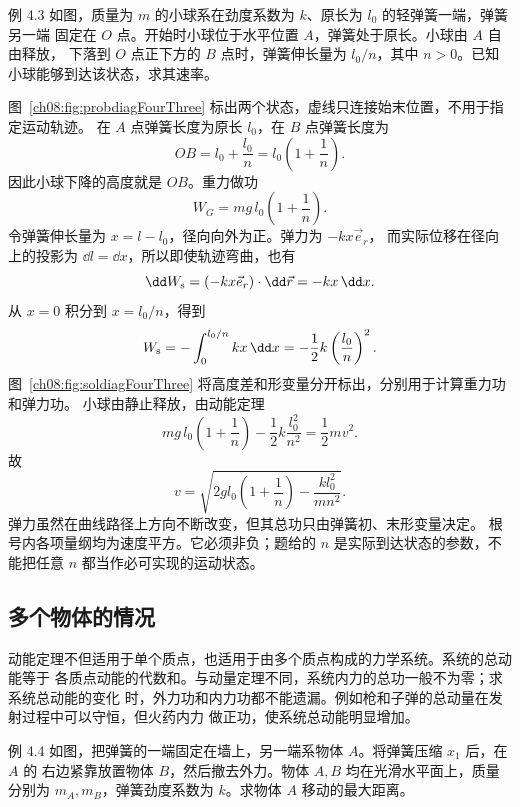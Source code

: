 \Needspace{0.35\textheight}
\begin{origexamplebox}{例 4.3}
如图，质量为 $m$ 的小球系在劲度系数为 $k$、原长为 $l_0$ 的轻弹簧一端，弹簧另一端
固定在 $O$ 点。开始时小球位于水平位置 $A$，弹簧处于原长。小球由 $A$ 自由释放，
下落到 $O$ 点正下方的 $B$ 点时，弹簧伸长量为 $l_0/n$，其中 $n>0$。已知小球能够到达该状态，求其速率。
\probdiagFourThree
\end{origexamplebox}

\begin{xesolution}
图~\ref{ch08:fig:probdiagFourThree} 标出两个状态，虚线只连接始末位置，不用于指定运动轨迹。
在 $A$ 点弹簧长度为原长 $l_0$，在 $B$ 点弹簧长度为
\[
 OB=l_0+\frac{l_0}{n}=l_0\left(1+\frac1n\right).
\]
因此小球下降的高度就是 $OB$。重力做功
\[
 W_G=mg\,l_0\left(1+\frac1n\right).
\]
令弹簧伸长量为 $x=l-l_0$，径向向外为正。弹力为 $-kx\vec e_r$，
而实际位移在径向上的投影为 $\dd l=\dd x$，所以即使轨迹弯曲，也有
\[
 \dd W_{\rm s}=(-kx\vec e_r)\cdot\dd\vec r=-kx\,\dd x.
\]
从 $x=0$ 积分到 $x=l_0/n$，得到
\[
 W_{\rm s}=-\int_0^{l_0/n}kx\,\dd x=-\frac12k\left(\frac{l_0}{n}\right)^2.
\]
图~\ref{ch08:fig:soldiagFourThree} 将高度差和形变量分开标出，分别用于计算重力功和弹力功。
\soldiagFourThree
小球由静止释放，由动能定理
\[
 mg\,l_0\left(1+\frac1n\right)
 -\frac12k\frac{l_0^2}{n^2}
 =\frac12mv^2.
\]
故
\[
 \boxed{
 v=\sqrt{2gl_0\left(1+\frac1n\right)
 -\frac{k l_0^2}{mn^2}}}.
\]
弹力虽然在曲线路径上方向不断改变，但其总功只由弹簧初、末形变量决定。
根号内各项量纲均为速度平方。它必须非负；题给的 $n$ 是实际到达状态的参数，不能把任意 $n$ 都当作必可实现的运动状态。
\end{xesolution}

\subsection{多个物体的情况}

动能定理不但适用于单个质点，也适用于由多个质点构成的力学系统。系统的总动能等于
各质点动能的代数和。与动量定理不同，系统内力的总功一般不为零；求系统总动能的变化
时，外力功和内力功都不能遗漏。例如枪和子弹的总动量在发射过程中可以守恒，但火药内力
做正功，使系统总动能明显增加。

\Needspace{0.32\textheight}
\begin{origexamplebox}{例 4.4}
如图，把弹簧的一端固定在墙上，另一端系物体 $A$。将弹簧压缩 $x_1$ 后，在 $A$ 的
右边紧靠放置物体 $B$，然后撤去外力。物体 $A,B$ 均在光滑水平面上，质量分别为
$m_A,m_B$，弹簧劲度系数为 $k$。求物体 $A$ 移动的最大距离。
\probdiagFourFour
\end{origexamplebox}

